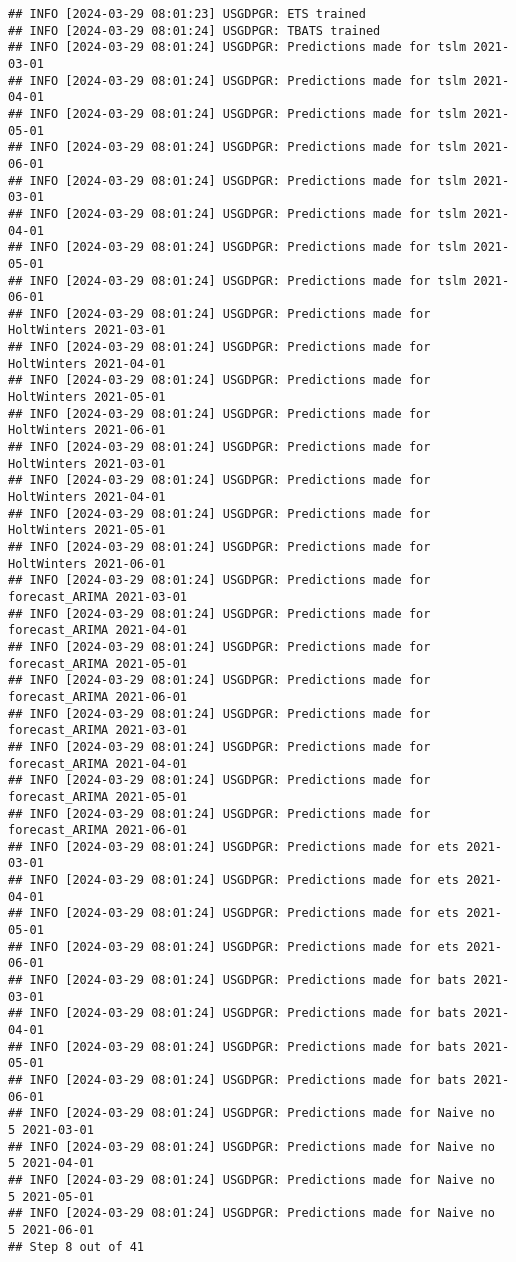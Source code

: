 \documentclass[
]{article}
\begin{document}
\begin{verbatim}
## INFO [2024-03-29 08:01:23] USGDPGR: ETS trained
## INFO [2024-03-29 08:01:24] USGDPGR: TBATS trained
## INFO [2024-03-29 08:01:24] USGDPGR: Predictions made for tslm 2021-03-01
## INFO [2024-03-29 08:01:24] USGDPGR: Predictions made for tslm 2021-04-01
## INFO [2024-03-29 08:01:24] USGDPGR: Predictions made for tslm 2021-05-01
## INFO [2024-03-29 08:01:24] USGDPGR: Predictions made for tslm 2021-06-01
## INFO [2024-03-29 08:01:24] USGDPGR: Predictions made for tslm 2021-03-01
## INFO [2024-03-29 08:01:24] USGDPGR: Predictions made for tslm 2021-04-01
## INFO [2024-03-29 08:01:24] USGDPGR: Predictions made for tslm 2021-05-01
## INFO [2024-03-29 08:01:24] USGDPGR: Predictions made for tslm 2021-06-01
## INFO [2024-03-29 08:01:24] USGDPGR: Predictions made for HoltWinters 2021-03-01
## INFO [2024-03-29 08:01:24] USGDPGR: Predictions made for HoltWinters 2021-04-01
## INFO [2024-03-29 08:01:24] USGDPGR: Predictions made for HoltWinters 2021-05-01
## INFO [2024-03-29 08:01:24] USGDPGR: Predictions made for HoltWinters 2021-06-01
## INFO [2024-03-29 08:01:24] USGDPGR: Predictions made for HoltWinters 2021-03-01
## INFO [2024-03-29 08:01:24] USGDPGR: Predictions made for HoltWinters 2021-04-01
## INFO [2024-03-29 08:01:24] USGDPGR: Predictions made for HoltWinters 2021-05-01
## INFO [2024-03-29 08:01:24] USGDPGR: Predictions made for HoltWinters 2021-06-01
## INFO [2024-03-29 08:01:24] USGDPGR: Predictions made for forecast_ARIMA 2021-03-01
## INFO [2024-03-29 08:01:24] USGDPGR: Predictions made for forecast_ARIMA 2021-04-01
## INFO [2024-03-29 08:01:24] USGDPGR: Predictions made for forecast_ARIMA 2021-05-01
## INFO [2024-03-29 08:01:24] USGDPGR: Predictions made for forecast_ARIMA 2021-06-01
## INFO [2024-03-29 08:01:24] USGDPGR: Predictions made for forecast_ARIMA 2021-03-01
## INFO [2024-03-29 08:01:24] USGDPGR: Predictions made for forecast_ARIMA 2021-04-01
## INFO [2024-03-29 08:01:24] USGDPGR: Predictions made for forecast_ARIMA 2021-05-01
## INFO [2024-03-29 08:01:24] USGDPGR: Predictions made for forecast_ARIMA 2021-06-01
## INFO [2024-03-29 08:01:24] USGDPGR: Predictions made for ets 2021-03-01
## INFO [2024-03-29 08:01:24] USGDPGR: Predictions made for ets 2021-04-01
## INFO [2024-03-29 08:01:24] USGDPGR: Predictions made for ets 2021-05-01
## INFO [2024-03-29 08:01:24] USGDPGR: Predictions made for ets 2021-06-01
## INFO [2024-03-29 08:01:24] USGDPGR: Predictions made for bats 2021-03-01
## INFO [2024-03-29 08:01:24] USGDPGR: Predictions made for bats 2021-04-01
## INFO [2024-03-29 08:01:24] USGDPGR: Predictions made for bats 2021-05-01
## INFO [2024-03-29 08:01:24] USGDPGR: Predictions made for bats 2021-06-01
## INFO [2024-03-29 08:01:24] USGDPGR: Predictions made for Naive no  5 2021-03-01
## INFO [2024-03-29 08:01:24] USGDPGR: Predictions made for Naive no  5 2021-04-01
## INFO [2024-03-29 08:01:24] USGDPGR: Predictions made for Naive no  5 2021-05-01
## INFO [2024-03-29 08:01:24] USGDPGR: Predictions made for Naive no  5 2021-06-01
## Step 8 out of 41
\end{verbatim}
\end{document}
